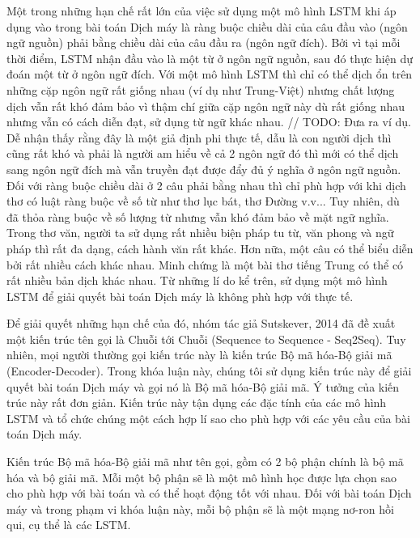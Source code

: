 Một trong những hạn chế rất lớn của việc sử dụng một mô hình LSTM khi áp dụng vào trong bài toán Dịch máy là ràng buộc chiều dài của câu đầu vào (ngôn ngữ nguồn) phải bằng chiều dài của câu đầu ra (ngôn ngữ đích). Bởi vì tại mỗi thời điểm, LSTM nhận đầu vào là một từ ở ngôn ngữ nguồn, sau đó thực hiện dự đoán một từ ở ngôn ngữ đích. Với một mô hình LSTM thì chỉ có thể dịch ổn trên những cặp ngôn ngữ rất giống nhau (ví dụ như Trung-Việt) nhưng chất lượng dịch vẫn rất khó đảm bảo vì thậm chí giữa cặp ngôn ngữ này dù rất giống nhau nhưng vẫn có cách diễn đạt, sử dụng từ ngữ khác nhau. // TODO: Đưa ra ví dụ. Dễ nhận thấy rằng đây là một giả định phi thực tế, dẫu là con người dịch thì cũng rất khó và phải là người am hiểu về cả 2 ngôn ngữ đó thì mới có thể dịch sang ngôn ngữ đích mà vẫn truyền đạt được đẩy đủ ý nghĩa ở ngôn ngữ nguồn. Đối với ràng buộc chiều dài ở 2 câu phải bằng nhau thì chỉ phù hợp với khi dịch thơ có luật ràng buộc về số từ như thơ lục bát, thơ Đường v.v... Tuy nhiên, dù đã thỏa ràng buộc về số lượng từ nhưng vẫn khó đảm bảo về mặt ngữ nghĩa. Trong thơ văn, người ta sử dụng rất nhiều biện pháp tu từ, văn phong và ngữ pháp thì rất đa dạng, cách hành văn rất khác. Hơn nữa, một câu có thể biểu diễn bởi rất nhiều cách khác nhau. Minh chứng là một bài thơ tiếng Trung có thể có rất nhiều bản dịch khác nhau. Từ những lí do kể trên, sử dụng một mô hình LSTM để giải quyết bài toán Dịch máy là không phù hợp với thực tế. 

Để giải quyết những hạn chế của đó, nhóm tác giả Sutskever, 2014 \cite{Seq2Seq2014} đã đề xuất một kiến trúc tên gọi là Chuỗi tới Chuỗi (Sequence to Sequence - Seq2Seq). Tuy nhiên, mọi người thường gọi kiến trúc này là kiến trúc Bộ mã hóa-Bộ giải mã (Encoder-Decoder). Trong khóa luận này, chúng tôi sử dụng kiến trúc này để giải quyết bài toán Dịch máy và gọi nó là Bộ mã hóa-Bộ giải mã. Ý tưởng của kiến trúc này rất đơn giản. Kiến trúc này tận dụng các đặc tính của các mô hình LSTM và tổ chức chúng một cách hợp lí sao cho phù hợp với các yêu cầu của bài toán Dịch máy. 

Kiến trúc Bộ mã hóa-Bộ giải mã như tên gọi, gồm có 2 bộ phận chính là bộ mã hóa và bộ giải mã. Mỗi một bộ phận sẽ là một mô hình học được lựa chọn sao cho phù hợp với bài toán và có thể hoạt động tốt với nhau. Đối với bài toán Dịch máy và trong phạm vi khóa luận này, mỗi bộ phận sẽ là một mạng nơ-ron hồi qui, cụ thể là các LSTM. 

